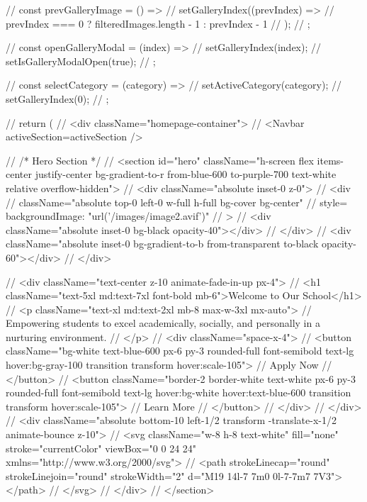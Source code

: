 {//   const prevGalleryImage = () => {
//     setGalleryIndex((prevIndex) => 
//       prevIndex === 0 ? filteredImages.length - 1 : prevIndex - 1
//     );
//   };

//   const openGalleryModal = (index) => {
//     setGalleryIndex(index);
//     setIsGalleryModalOpen(true);
//   };

//   const selectCategory = (category) => {
//     setActiveCategory(category);
//     setGalleryIndex(0);
//   };

//   return (
//     <div className="homepage-container">
//       <Navbar activeSection={activeSection} />
      
//       {/* Hero Section */}
//       <section id="hero" className="h-screen flex items-center justify-center bg-gradient-to-r from-blue-600 to-purple-700 text-white relative overflow-hidden">
//         <div className="absolute inset-0 z-0">
//           <div 
//             className="absolute top-0 left-0 w-full h-full bg-cover bg-center"
//             style={{ backgroundImage: "url('/images/image2.avif')" }}
//           >
//             <div className="absolute inset-0 bg-black opacity-40"></div>
//           </div>
//           <div className="absolute inset-0 bg-gradient-to-b from-transparent to-black opacity-60"></div>
//         </div>
        
//         <div className="text-center z-10 animate-fade-in-up px-4">
//           <h1 className="text-5xl md:text-7xl font-bold mb-6">Welcome to Our School</h1>
//           <p className="text-xl md:text-2xl mb-8 max-w-3xl mx-auto">
//             Empowering students to excel academically, socially, and personally in a nurturing environment.
//           </p>
//           <div className="space-x-4">
//             <button className="bg-white text-blue-600 px-6 py-3 rounded-full font-semibold text-lg hover:bg-gray-100 transition transform hover:scale-105">
//               Apply Now
//             </button>
//             <button className="border-2 border-white text-white px-6 py-3 rounded-full font-semibold text-lg hover:bg-white hover:text-blue-600 transition transform hover:scale-105">
//               Learn More
//             </button>
//           </div>
//         </div>
//         <div className="absolute bottom-10 left-1/2 transform -translate-x-1/2 animate-bounce z-10">
//           <svg className="w-8 h-8 text-white" fill="none" stroke="currentColor" viewBox="0 0 24 24" xmlns="http://www.w3.org/2000/svg">
//             <path strokeLinecap="round" strokeLinejoin="round" strokeWidth="2" d="M19 14l-7 7m0 0l-7-7m7 7V3"></path>
//           </svg>
//         </div>
//       </section>

}
